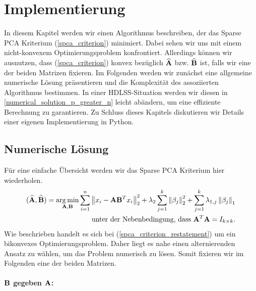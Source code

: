 \chapter{Implementierung}

\label{implementation}

In diesem Kapitel werden wir einen Algorithmus beschreiben, der das Sparse PCA Kriterium (\ref{spca_criterion}) minimiert. Dabei sehen wir uns mit einem nicht-konvexem Optimierungsproblem konfrontiert. Allerdings können wir ausnutzen, dass (\ref{spca_criterion}) konvex bezüglich $\widehat{\mathbf{A}}$ bzw. $\widehat{\mathbf{B}}$ ist, falls wir eine der beiden Matrizen fixieren. Im Folgenden werden wir zunächst eine allgemeine numerische Lösung präsentieren und die Komplexität des assoziierten Algorithmus bestimmen. In einer HDLSS-Situation werden wir diesen in \ref{numerical_solution_p_greater_n} leicht abändern, um eine effiziente Berechnung zu garantieren. Zu Schluss dieses Kapitels diskutieren wir Details einer eigenen Implementierung in Python.




\section{Numerische Lösung}
\label{spca_numerical_solution}

Für eine einfache Übersicht werden wir das Sparse PCA Kriterium hier wiederholen.
\begin{align}
\label{spca_criterion_restatement}
\begin{split}
(\widehat{\mathbf{A}}, \widehat{\mathbf{B}}) = \operatorname*{arg\,min}_{\mathbf{A}, \mathbf{B}} \sum_{i=1}^{n} \left\lVert x_i - \mathbf{A}\mathbf{B}^Tx_i \right\rVert_2^2 + \lambda_2 \sum_{j=1}^{k}\left\lVert \beta_j \right\rVert_2^2 + \sum_{j=1}^k \lambda_{1,j} \left\lVert \beta_j \right\rVert_1\\
\text{unter der Nebenbedingung, dass } \mathbf{A}^T\mathbf{A} = I_{k \times k}.
\end{split}
\end{align}
Wie beschrieben handelt es sich bei (\ref{spca_criterion_restatement}) um ein bikonvexes Optimierungsproblem. Daher liegt es nahe einen alternierenden Ansatz zu wählen, um das Problem numerisch zu lösen. Somit fixieren wir im Folgenden eine der beiden Matrizen.

\subsubsection{$\mathbf{B}$ gegeben $\mathbf{A}$:}

